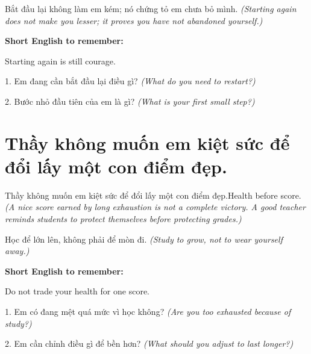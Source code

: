 \begin{baihoc}
Bắt đầu lại không làm em kém; nó chứng tỏ em chưa bỏ mình.
\textit{(Starting again does not make you lesser; it proves you have not abandoned yourself.)}
\end{baihoc}

\begin{ghinhoanh}
\textbf{Short English to remember:}

Starting again is still courage.

\end{ghinhoanh}

\begin{tuhocnhanh}
1. Em đang cần bắt đầu lại điều gì? \textit{(What do you need to restart?)}

2. Bước nhỏ đầu tiên của em là gì? \textit{(What is your first small step?)}
\end{tuhocnhanh}
\ngancach


\section{Thầy không muốn em kiệt sức để đổi lấy một con điểm đẹp.}
\begin{truyen}{Thầy không muốn em kiệt sức để đổi lấy một con điểm đẹp.}{Health before score.}
\textit{(A nice score earned by long exhaustion is not a complete victory. A good teacher reminds students to protect themselves before protecting grades.)}
\end{truyen}

\begin{baihoc}
Học để lớn lên, không phải để mòn đi.
\textit{(Study to grow, not to wear yourself away.)}
\end{baihoc}

\begin{ghinhoanh}
\textbf{Short English to remember:}

Do not trade your health for one score.

\end{ghinhoanh}

\begin{tuhocnhanh}
1. Em có đang mệt quá mức vì học không? \textit{(Are you too exhausted because of study?)}

2. Em cần chỉnh điều gì để bền hơn? \textit{(What should you adjust to last longer?)}
\end{tuhocnhanh}
\ngancach


